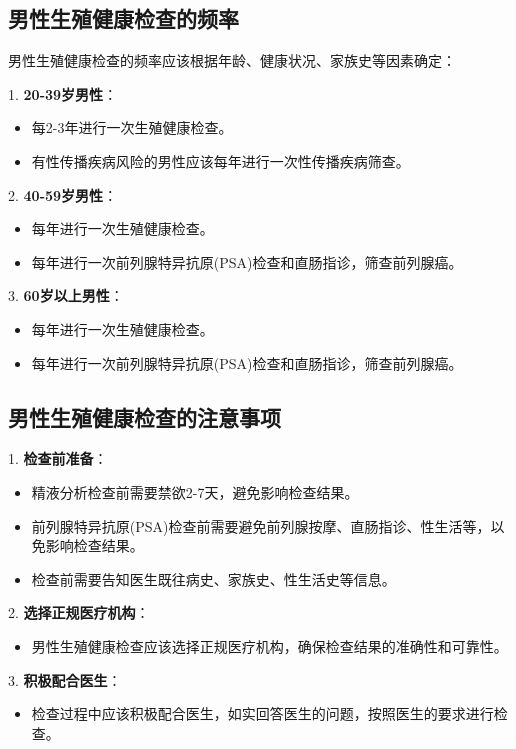 \documentclass[12pt,a4paper,twoside]{ctexbook}
\begin{document}
\subsection{男性生殖健康检查的频率}

男性生殖健康检查的频率应该根据年龄、健康状况、家族史等因素确定：

1. \textbf{20-39岁男性}：
  \begin{itemize}
  \item 每2-3年进行一次生殖健康检查。
  \item 有性传播疾病风险的男性应该每年进行一次性传播疾病筛查。
  \end{itemize}

2. \textbf{40-59岁男性}：
  \begin{itemize}
  \item 每年进行一次生殖健康检查。
  \item 每年进行一次前列腺特异抗原(PSA)检查和直肠指诊，筛查前列腺癌。
  \end{itemize}

3. \textbf{60岁以上男性}：
  \begin{itemize}
  \item 每年进行一次生殖健康检查。
  \item 每年进行一次前列腺特异抗原(PSA)检查和直肠指诊，筛查前列腺癌。
  \end{itemize}

\subsection{男性生殖健康检查的注意事项}

1. \textbf{检查前准备}：
  \begin{itemize}
  \item 精液分析检查前需要禁欲2-7天，避免影响检查结果。
  \item 前列腺特异抗原(PSA)检查前需要避免前列腺按摩、直肠指诊、性生活等，以免影响检查结果。
  \item 检查前需要告知医生既往病史、家族史、性生活史等信息。
  \end{itemize}

2. \textbf{选择正规医疗机构}：
  \begin{itemize}
  \item 男性生殖健康检查应该选择正规医疗机构，确保检查结果的准确性和可靠性。
  \end{itemize}

3. \textbf{积极配合医生}：
  \begin{itemize}
  \item 检查过程中应该积极配合医生，如实回答医生的问题，按照医生的要求进行检查。
  \end{itemize}
\end{document}
